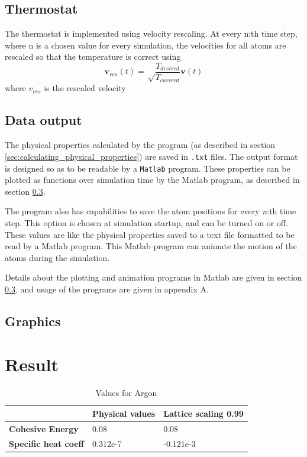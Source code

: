 \documentclass[12pt,a4paper]{article}
\begin{document}
\subsection{Thermostat}
\label{sec:thermostat}

The thermostat is implemented using velocity rescaling.
At every n:th time step, where n is a chosen value for every simulation, the velocities for all atoms are rescaled so that the temperature is correct using
\begin{equation}
\mathbf v_{res}(t)=\sqrt \frac {T_{desired}} {T_{current}} \mathbf v(t)
\end{equation}
where \( v_{res}\) is the rescaled velocity

\subsection{Data output}
\label{sec:data_output}
The physical properties calculated by the program (as described in section \ref{sec:calculating_physical_properties}) are saved in \texttt{.txt} files. The output format is designed so as to be readable by a \texttt{Matlab} program. These properties can be plotted as functions over simulation time by the Matlab program, as described in section \ref{sec:graphics}. 

The program also has capabilities to save the atom positions for every \emph{n}:th time step. This option is chosen at simulation startup, and can be turned on or off. These values are like the physical properties saved to a text file formatted to be read by a Matlab program. This Matlab program can animate the motion of the atoms during the simulation. 

Details about the plotting and animation programs in Matlab are given in section \ref{sec:graphics}, and usage of the programs are given in appendix A.

\subsection{Graphics}
\label{sec:graphics}


\newpage
\section{Result}
\label{sec:Result}

\begin{center}
\begin{table}[h]
\caption{Values for Argon}
\begin{tabular}{| l | l | l |}
\hline
  & \textbf{Physical values} & \textbf{Lattice scaling 0.99} \\
\hline
\textbf{Cohesive Energy} & 0.08 & 0.08 \\
\hline
\textbf{Specific heat coeff} & 0.312e-7 & -0.121e-3 \\
\hline
\end{tabular}
\end{table}
\end{center}
\end{document}
